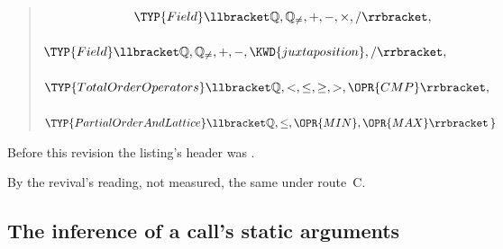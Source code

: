 \begin{description}
\begin{quote}
\begin{Fortress}
{\tt~~~~~~~~~~~~~~}\(              \TYP{Field}\llbracket\mathbb{Q},\mathbb{Q}_{\neq},+,-,\times,/\rrbracket,\)\\
{\tt~~~~~~~~~~~~~~}\(              \TYP{Field}\llbracket\mathbb{Q},\mathbb{Q}_{\neq},+,-,\KWD{juxtaposition},/\rrbracket,\)\\
{\tt~~~~~~~~~~~~~~}\(              \TYP{TotalOrderOperators}\llbracket\mathbb{Q},<,\leq,\geq,>,\OPR{CMP}\rrbracket,\)\\
{\tt~~~~~~~~~~~~~~}\(              \TYP{PartialOrderAndLattice}\llbracket\mathbb{Q},\leq,\OPR{MIN},\OPR{MAX}\rrbracket\,\}\)
\end{Fortress}
\end{quote}
Before this revision the listing's header was
.
\item[Route C] By the revival's reading, not measured, the same under route~C.
\end{description}

\subsection{The inference of a call's static arguments}

